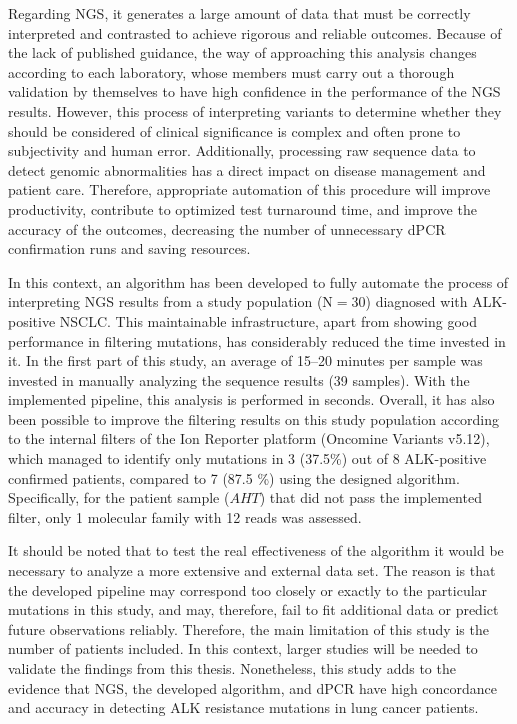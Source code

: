Regarding NGS, it generates a large amount of data that must be correctly interpreted and contrasted to achieve rigorous and reliable outcomes. Because of the lack of published guidance, the way of approaching this analysis changes according to each laboratory, whose members must carry out a thorough validation by themselves to have high confidence in the performance of the NGS results. However, this process of interpreting variants to determine whether they should be considered of clinical significance is complex and often prone to subjectivity and human error. Additionally, processing raw sequence data to detect genomic abnormalities has a direct impact on disease management and patient care. 
Therefore, appropriate automation of this procedure will improve productivity, contribute to optimized test turnaround time, and improve the accuracy of the outcomes, decreasing the number of unnecessary dPCR confirmation runs and saving resources.

In this context, an algorithm has been developed to fully automate the process of interpreting NGS results from a study population (N$=$30) diagnosed with ALK-positive NSCLC. This maintainable infrastructure, apart from showing good performance in filtering mutations, has considerably reduced the time invested in it. In the first part of this study, an average of 15–20 minutes per sample was invested in manually analyzing the sequence results (39 samples). With the implemented pipeline, this analysis is performed in seconds. Overall, it has also been possible to improve the filtering results on this study population according to the internal filters of the Ion Reporter\texttrademark{} platform (Oncomine\texttrademark{} Variants v5.12), which managed to identify only mutations in 3 (37.5\%) out of 8 ALK-positive confirmed patients, compared to 7 (87.5 \%) using the designed algorithm. Specifically, for the patient sample ($AHT$) that did not pass the implemented filter, only 1 molecular family with 12 reads was assessed.

It should be noted that to test the real effectiveness of the algorithm it would be necessary to analyze a more extensive and external data set. The reason is that the developed pipeline may correspond too closely or exactly to the particular mutations in this study, and may, therefore, fail to fit additional data or predict future observations reliably. Therefore, the main limitation of this study is the number of patients included. In this context, larger studies will be needed to validate the findings from this thesis. Nonetheless, this study adds to the evidence that NGS, the developed algorithm, and dPCR have high concordance and accuracy in detecting ALK resistance mutations in lung cancer patients.

